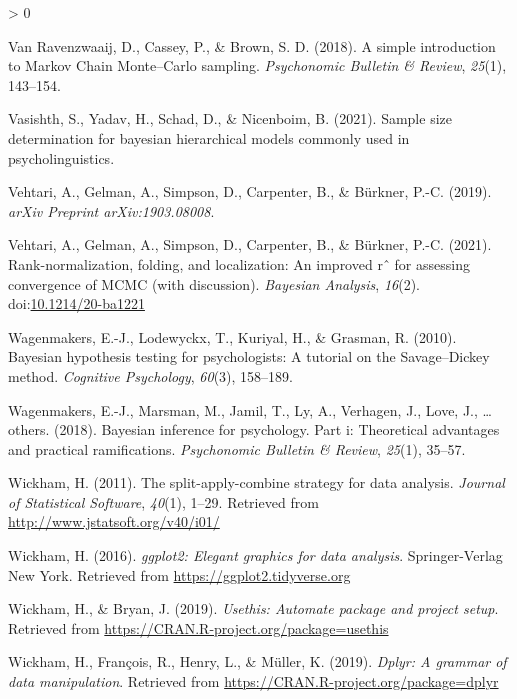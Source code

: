 \documentclass[
  english,
  doc,floatsintext]{apa6}
\newlength{\cslhangindent}
\newenvironment{CSLReferences}[2] %
 {%
  \setlength{\parindent}{0pt}
  \ifodd #1 \everypar{\setlength{\hangindent}{\cslhangindent}}\ignorespaces\fi
  \ifnum #2 > 0
  \setlength{\parskip}{#2\baselineskip}
  \fi
 }%
 {}
\begin{document}
\begin{CSLReferences}{1}{0}
\leavevmode\hypertarget{ref-van2018simple}{}%
Van Ravenzwaaij, D., Cassey, P., \& Brown, S. D. (2018). A simple introduction to {Markov Chain Monte--Carlo} sampling. \emph{Psychonomic Bulletin \& Review}, \emph{25}(1), 143--154.

\leavevmode\hypertarget{ref-vasishth2021sample}{}%
Vasishth, S., Yadav, H., Schad, D., \& Nicenboim, B. (2021). Sample size determination for bayesian hierarchical models commonly used in psycholinguistics.

\leavevmode\hypertarget{ref-vehtari2019rank}{}%
Vehtari, A., Gelman, A., Simpson, D., Carpenter, B., \& Bürkner, P.-C. (2019). \emph{arXiv Preprint arXiv:1903.08008}.

\leavevmode\hypertarget{ref-Vehtari_2021}{}%
Vehtari, A., Gelman, A., Simpson, D., Carpenter, B., \& Bürkner, P.-C. (2021). Rank-normalization, folding, and localization: An improved rˆ for assessing convergence of MCMC (with discussion). \emph{Bayesian Analysis}, \emph{16}(2). doi:\href{https://doi.org/10.1214/20-ba1221}{10.1214/20-ba1221}

\leavevmode\hypertarget{ref-wagenmakers2010bayesian}{}%
Wagenmakers, E.-J., Lodewyckx, T., Kuriyal, H., \& Grasman, R. (2010). Bayesian hypothesis testing for psychologists: A tutorial on the {Savage--Dickey} method. \emph{Cognitive Psychology}, \emph{60}(3), 158--189.

\leavevmode\hypertarget{ref-wagenmakers2018bayesian}{}%
Wagenmakers, E.-J., Marsman, M., Jamil, T., Ly, A., Verhagen, J., Love, J., \ldots{} others. (2018). Bayesian inference for psychology. Part i: Theoretical advantages and practical ramifications. \emph{Psychonomic Bulletin \& Review}, \emph{25}(1), 35--57.

\leavevmode\hypertarget{ref-R-plyr}{}%
Wickham, H. (2011). The split-apply-combine strategy for data analysis. \emph{Journal of Statistical Software}, \emph{40}(1), 1--29. Retrieved from \url{http://www.jstatsoft.org/v40/i01/}

\leavevmode\hypertarget{ref-R-ggplot2}{}%
Wickham, H. (2016). \emph{ggplot2: Elegant graphics for data analysis}. Springer-Verlag New York. Retrieved from \url{https://ggplot2.tidyverse.org}

\leavevmode\hypertarget{ref-R-usethis}{}%
Wickham, H., \& Bryan, J. (2019). \emph{Usethis: Automate package and project setup}. Retrieved from \url{https://CRAN.R-project.org/package=usethis}

\leavevmode\hypertarget{ref-R-dplyr}{}%
Wickham, H., François, R., Henry, L., \& Müller, K. (2019). \emph{Dplyr: A grammar of data manipulation}. Retrieved from \url{https://CRAN.R-project.org/package=dplyr}


\end{CSLReferences}
\end{document}
